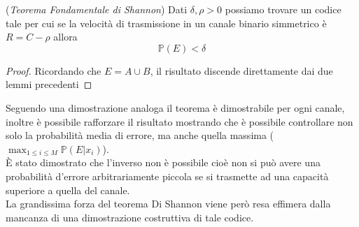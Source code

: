 \begin{teo} (\textit{Teorema Fondamentale di Shannon})
Dati $\delta , \rho > 0$ possiamo trovare un codice tale per cui se la velocità di trasmissione in un canale binario simmetrico è $R=C-\rho$ allora
$$\mathbb{P}(E)< \delta$$
\end{teo}
\begin{proof}
Ricordando che $E=A\cup B$, il risultato discende direttamente dai due lemmi precedenti
\end{proof}
Seguendo una dimostrazione analoga il teorema è dimostrabile per ogni canale, inoltre è possibile rafforzare il risultato mostrando che è possibile controllare non solo la probabilità media di errore, ma anche quella massima ($\max_{1\leq i \leq M} \mathbb{P}(E|x_i)$).\\
È stato dimostrato che l'inverso non è possibile cioè non si può avere una probabilità d'errore arbitrariamente piccola se si trasmette ad una capacità superiore a quella del canale.\\
La grandissima forza del teorema Di Shannon viene però resa effimera dalla mancanza di una dimostrazione costruttiva di tale codice.



